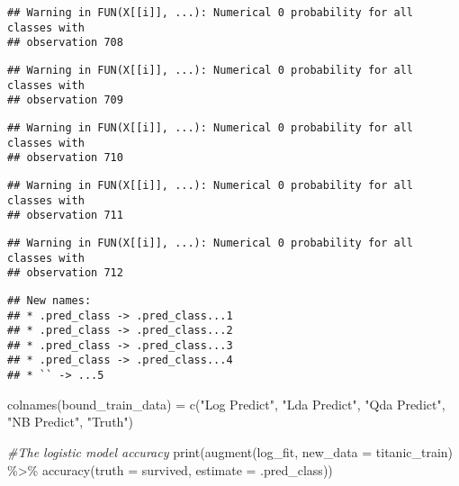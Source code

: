 \documentclass[
]{article}
\newenvironment{Shaded}{\begin{snugshade}}{\end{snugshade}}
\newcommand{\AttributeTok}[1]{\textcolor[rgb]{0.77,0.63,0.00}{#1}}
\newcommand{\CommentTok}[1]{\textcolor[rgb]{0.56,0.35,0.01}{\textit{#1}}}
\newcommand{\FunctionTok}[1]{\textcolor[rgb]{0.00,0.00,0.00}{#1}}
\newcommand{\NormalTok}[1]{#1}
\newcommand{\OtherTok}[1]{\textcolor[rgb]{0.56,0.35,0.01}{#1}}
\newcommand{\SpecialCharTok}[1]{\textcolor[rgb]{0.00,0.00,0.00}{#1}}
\newcommand{\StringTok}[1]{\textcolor[rgb]{0.31,0.60,0.02}{#1}}
\begin{document}
\begin{verbatim}
## Warning in FUN(X[[i]], ...): Numerical 0 probability for all classes with
## observation 708
\end{verbatim}

\begin{verbatim}
## Warning in FUN(X[[i]], ...): Numerical 0 probability for all classes with
## observation 709
\end{verbatim}

\begin{verbatim}
## Warning in FUN(X[[i]], ...): Numerical 0 probability for all classes with
## observation 710
\end{verbatim}

\begin{verbatim}
## Warning in FUN(X[[i]], ...): Numerical 0 probability for all classes with
## observation 711
\end{verbatim}

\begin{verbatim}
## Warning in FUN(X[[i]], ...): Numerical 0 probability for all classes with
## observation 712
\end{verbatim}

\begin{verbatim}
## New names:
## * .pred_class -> .pred_class...1
## * .pred_class -> .pred_class...2
## * .pred_class -> .pred_class...3
## * .pred_class -> .pred_class...4
## * `` -> ...5
\end{verbatim}

\begin{Shaded}
\begin{Highlighting}[]
\FunctionTok{colnames}\NormalTok{(bound\_train\_data) }\OtherTok{=} \FunctionTok{c}\NormalTok{(}\StringTok{"Log Predict"}\NormalTok{, }\StringTok{"Lda Predict"}\NormalTok{, }\StringTok{"Qda Predict"}\NormalTok{,}
                               \StringTok{"NB Predict"}\NormalTok{, }\StringTok{"Truth"}\NormalTok{)}
\end{Highlighting}
\end{Shaded}

\begin{Shaded}
\begin{Highlighting}[]
\CommentTok{\#The logistic model accuracy}
\FunctionTok{print}\NormalTok{(}\FunctionTok{augment}\NormalTok{(log\_fit, }\AttributeTok{new\_data =}\NormalTok{ titanic\_train) }\SpecialCharTok{\%\textgreater{}\%}
 \FunctionTok{accuracy}\NormalTok{(}\AttributeTok{truth =}\NormalTok{ survived, }\AttributeTok{estimate =}\NormalTok{ .pred\_class))}
\end{Highlighting}
\end{Shaded}
\end{document}
